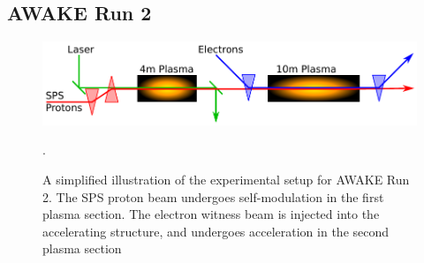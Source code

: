 \documentclass[aps,prstab,reprint,amsmath,amssymb,groupedaddress]{revtex4-1}
\begin{document}


\subsection{AWAKE Run 2}\label{S:I:AWAKE}

\begin{figure}[hbt]
    \includegraphics[width=0.99\linewidth,trim={1mm 2mm 1mm 2mm},clip]{figures/figAWAKE}
    \caption{\label{Fig:AWAKER2} A simplified illustration of the experimental setup for AWAKE Run 2. The SPS proton
        beam undergoes self-modulation in the first plasma section. The electron witness beam is injected into the
        accelerating structure, and undergoes acceleration in the second plasma
        section~\cite{berglyd_olsen:2015, adli:2016}}.
\end{figure}
\end{document}
